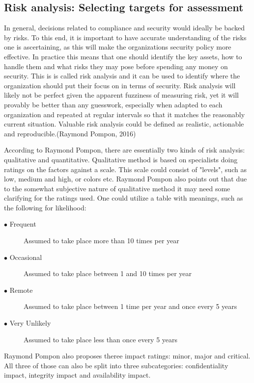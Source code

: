 \documentclass{article}
\begin{document}
\subsection{Risk analysis: Selecting targets for assessment}
In general, decisions related to compliance and security would ideally be backed by risks. To this end, it is important to have accurate understanding of the risks one is ascertaining, as this will make the organizations security policy more effective.
In practice this means that one should identify the key assets, how to handle them and what risks they may pose before spending any money on security. This is is called risk analysis and it can be used to identify where the organization should put their focus on in terms of security. Risk analysis will likely not be perfect given the apparent fuzziness of measuring risk, yet it will provably be better than any guesswork, especially when adapted to each organization and repeated at regular intervals so that it matches the reasonably current situation. Valuable risk analysis could be defined as realistic, actionable and reproducible.(Raymond Pompon, 2016)
\par
According to Raymond Pompon, there are essentially two kinds of risk analysis: qualitative and quantitative. Qualitative method is based on specialists doing ratings on the factors against a scale. This scale could consist of "levels", such as low, medium and high, or colors etc.
Raymond Pompon also points out that due to the somewhat subjective nature of qualitative method it may need some clarifying for the ratings used. One could utilize a table with meanings, such as the following for likelihood:
\begin{description}
	\item[$\bullet$ Frequent] Assumed to take place more than 10 times per year
	\item[$\bullet$ Occasional]Assumed to take place between 1 and 10 times per year
	\item[$\bullet$ Remote] Assumed to take place between 1 time per year and once every 5 years
	\item[$\bullet$ Very Unlikely] Assumed to take place less than once every 5 years
\end{description}
Raymond Pompon also proposes theree impact ratings: minor, major and critical. All three of those can also be split into three subcategories: confidentiality impact, integrity impact and availability impact.
\end{document}
